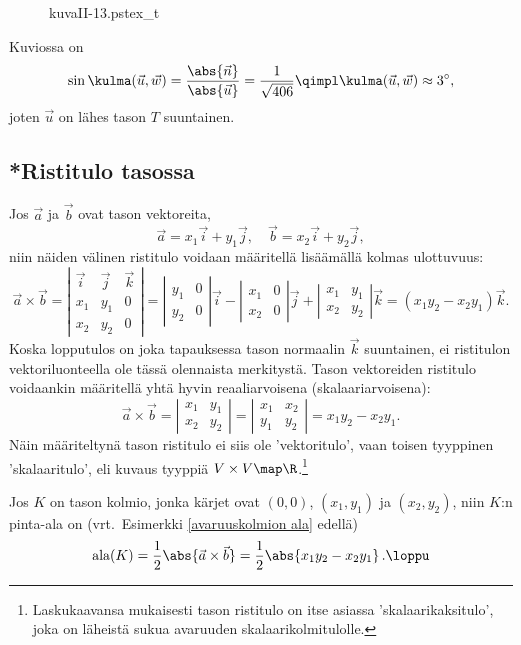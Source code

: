 \begin{figure}[H]
\begin{center}
{kuvaII-13.pstex_t}
\end{center}
\end{figure}
Kuviossa on
\[
\sin{\kulma (\vec u, \vec w)} = \frac{\abs{\vec n}}{\abs{\vec u}} = \frac{1}{\sqrt{406}}
                                \qimpl \kulma (\vec u, \vec w) \approx 3^{\circ},
\]
joten $\vec u$ on lähes tason $T$ suuntainen. \loppu

\pagebreak

\subsection*{*Ristitulo tasossa}

Jos $\vec a$ ja $\vec b$ ovat tason vektoreita, 
\[
\vec a=x_1\vec i + y_1 \vec j, \quad \vec b=x_2\vec i + y_2 \vec j,
\]
niin näiden välinen ristitulo voidaan määritellä lisäämällä kolmas ulottuvuus:
\[
\vec a \times \vec b = \left| \begin{array}{ccc}
\vec i & \vec j & \vec k \\
x_1 & y_1 & 0 \\
x_2 & y_2 & 0 
\end{array} \right|
=
\left|\begin{array}{cc} 
y_1 & 0 \\
y_2 & 0
\end{array} \right| \vec i -
\left|\begin{array}{cc} 
x_1 & 0 \\
x_2 & 0
\end{array} \right| \vec j +
\left|\begin{array}{cc} 
x_1 & y_1 \\
x_2 & y_2
\end{array} \right| \vec k
=(x_1y_2-x_2y_1)\vec k.
\]
Koska lopputulos on joka tapauksessa tason normaalin $\vec k$ suuntainen, ei ristitulon
vektoriluonteella ole tässä olennaista merkitystä. Tason vektoreiden ristitulo voidaankin
määritellä yhtä hyvin reaaliarvoisena (skalaariarvoisena):
\[
\vec a \times \vec b = \left|\begin{array}{cc} x_1 & y_1 \\ x_2 & y_2 \end{array} \right| 
                     = \left|\begin{array}{cc} x_1 & x_2 \\ y_1 & y_2 \end{array} \right|
                     = x_1y_2-x_2y_1.
\]
Näin määriteltynä tason ristitulo ei siis ole 'vektoritulo', vaan toisen tyyppinen 
'skalaaritulo', eli kuvaus tyyppiä $V \times V \map \R$.\footnote[1]{Laskukaavansa mukaisesti
tason ristitulo on itse asiassa 'skalaarikaksitulo', joka on läheistä sukua avaruuden
skalaarikolmitulolle.} 
\begin{Exa} Jos $K$ on tason kolmio, jonka kärjet ovat $(0,0)$, $(x_1,y_1)$ ja $(x_2,y_2)$,
niin $K$:n pinta-ala on (vrt.\ Esimerkki \ref{avaruuskolmion ala} edellä)
\[
\text{ala}(K)=\frac{1}{2}\abs{\vec a\times\vec b}=\frac{1}{2}\abs{x_1y_2-x_2y_1}\,. \loppu
\]
\end{Exa}

